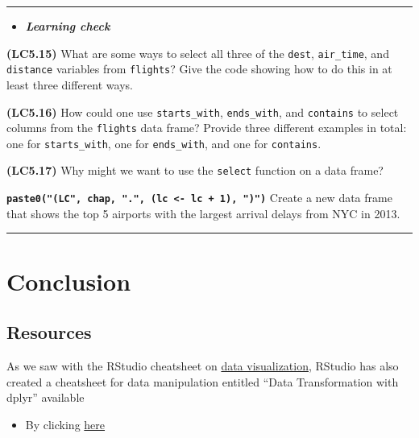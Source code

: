 \documentclass[]{tufte-book}
\let\oldrule=\rule
\renewcommand{\rule}[1]{\oldrule{\linewidth}}
\providecommand{\tightlist}{%
  \setlength{\itemsep}{0pt}\setlength{\parskip}{0pt}}
\newenvironment{rmdblock}[1]
  {\begin{shaded*}
  \begin{itemize}
  \renewcommand{\labelitemi}{
    \raisebox{-.7\height}[0pt][0pt]{
    }
  }
  \item
  }
  {
  \end{itemize}
  \end{shaded*}
  }
\newenvironment{learncheck}
  {\begin{rmdblock}{warning}}
  {\end{rmdblock}}
\begin{document}
\begin{center}\rule{0.5\linewidth}{\linethickness}\end{center}

\begin{learncheck}
\textbf{\emph{Learning check}}
\end{learncheck}

\textbf{(LC5.15)} What are some ways to select all three of the
\texttt{dest}, \texttt{air\_time}, and \texttt{distance} variables from
\texttt{flights}? Give the code showing how to do this in at least three
different ways.

\textbf{(LC5.16)} How could one use \texttt{starts\_with},
\texttt{ends\_with}, and \texttt{contains} to select columns from the
\texttt{flights} data frame? Provide three different examples in total:
one for \texttt{starts\_with}, one for \texttt{ends\_with}, and one for
\texttt{contains}.

\textbf{(LC5.17)} Why might we want to use the \texttt{select} function
on a data frame?

\textbf{\texttt{paste0("(LC",\ chap,\ ".",\ (lc\ \textless{}-\ lc\ +\ 1),\ ")")}}
Create a new data frame that shows the top 5 airports with the largest
arrival delays from NYC in 2013.

\begin{center}\rule{0.5\linewidth}{\linethickness}\end{center}

\section{Conclusion}\label{conclusion-1}

\subsection{Resources}\label{resources-1}

As we saw with the RStudio cheatsheet on
\href{https://www.rstudio.com/wp-content/uploads/2016/11/ggplot2-cheatsheet-2.1.pdf}{data
visualization}, RStudio has also created a cheatsheet for data
manipulation entitled ``Data Transformation with dplyr'' available

\begin{itemize}
\tightlist
\item
  By clicking
  \href{https://github.com/rstudio/cheatsheets/raw/master/source/pdfs/data-transformation-cheatsheet.pdf}{here}
\end{itemize}
\end{document}
